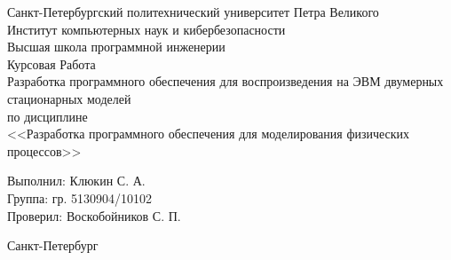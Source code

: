 \begin{titlepage}	%

	\begin{center}		%

		\large Санкт-Петербургский политехнический университет Петра Великого\\
		\large Институт компьютерных наук и кибербезопасности\\
		\large Высшая школа программной инженерии \\[6cm]

    \huge Курсовая Работа\\[0.5cm] %
		\large Разработка программного обеспечения для воспроизведения на ЭВМ двумерных стационарных моделей \\[0.1cm]
		\large по дисциплине \\
		\large <<Разработка программного обеспечения для моделирования физических процессов>> \\[5cm]

	\end{center}

		\noindent\large Выполнил: \hfill \large Клюкин С. А.\\
		\noindent\large Группа: \hfill \large гр. 5130904/10102\\

		\noindent\large Проверил: \hfill \large Воскобойников С. П.

	\vfill %

	\begin{center}
	\large Санкт-Петербург\\
	\large \the\year %
	\end{center} %

\end{titlepage} %

\vfill %

